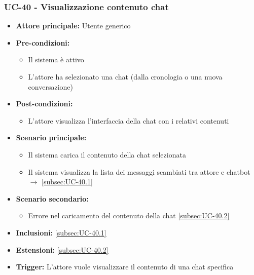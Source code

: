 \documentclass[a4paper,12pt]{article}
\begin{document}
\subsubsection{UC-40 - Visualizzazione contenuto chat} \label{subsec:UC-40}
\begin{itemize}
    \item \textbf{Attore principale:} Utente generico
    \item \textbf{Pre-condizioni:}
    \begin{itemize}
        \item Il sistema è attivo
        \item L'attore ha selezionato una chat (dalla cronologia o una nuova conversazione)
    \end{itemize}
    \item \textbf{Post-condizioni:} 
    \begin{itemize}
        \item L'attore visualizza l'interfaccia della chat con i relativi contenuti
    \end{itemize}
    \item \textbf{Scenario principale:} 
    \begin{itemize}
        \item Il sistema carica il contenuto della chat selezionata
        \item Il sistema visualizza la lista dei messaggi scambiati tra attore e chatbot $\rightarrow$ \ref{subsec:UC-40.1}
    \end{itemize}
    \item \textbf{Scenario secondario:} 
    \begin{itemize}
        \item Errore nel caricamento del contenuto della chat \ref{subsec:UC-40.2}
    \end{itemize}
    \item \textbf{Inclusioni:} \ref{subsec:UC-40.1}
    \item \textbf{Estensioni:} \ref{subsec:UC-40.2}
    \item \textbf{Trigger:} L'attore vuole visualizzare il contenuto di una chat specifica
\end{itemize}
\end{document}
